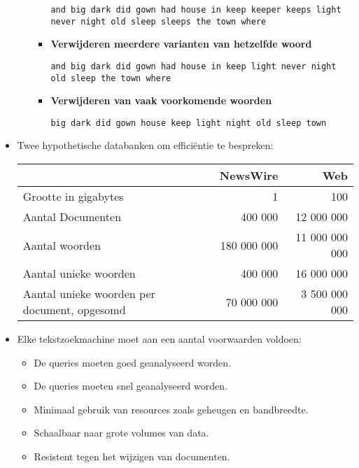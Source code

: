 \begin{itemize}
\begin{itemize}
\begin{itemize}
            \texttt{and big dark did gown had house in keep keeper keeps light never night old sleep sleeps the town where}

            \item \textbf{Verwijderen meerdere varianten van hetzelfde woord}

            \texttt{and big dark did gown had house in keep light never night old sleep the town where}

            \item \textbf{Verwijderen van vaak voorkomende woorden}

            \texttt{big dark did gown house keep light night old sleep town}
        \end{itemize}
    \end{itemize}

    \item Twee hypothetische databanken om efficiëntie te bespreken:
    \begin{table}[ht]
        \centering
        \begin{tabular}{l r r}
            \hline
            & NewsWire & Web \\
            \hline
            Grootte in gigabytes & 1 & 100 \\
            Aantal Documenten & 400 000 & 12 000 000 \\
            Aantal woorden   & 180 000 000 & 11 000 000 000 \\
            Aantal unieke woorden & 400 000 & 16 000 000 \\
            Aantal unieke woorden per document, opgesomd & 70 000 000 & 3 500 000 000 \\
            \hline
        \end{tabular}
    \end{table}
    \item Elke tekstzoekmachine moet aan een aantal voorwaarden voldoen:
    \begin{itemize}
        \item De queries moeten goed geanalyseerd worden.
        \item De queries moeten snel geanalyseerd worden.
        \item Minimaal gebruik van resources zoals geheugen en bandbreedte.
        \item Schaalbaar naar grote volumes van data.
        \item Resistent tegen het wijzigen van documenten.
    \end{itemize}
\end{itemize}

